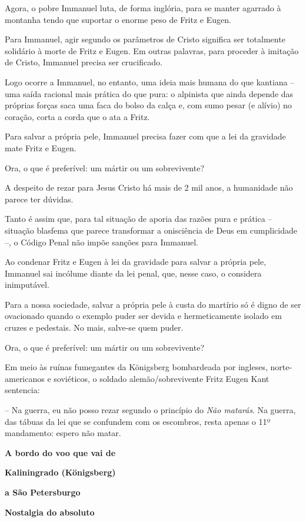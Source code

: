 Agora, o pobre Immanuel luta, de forma inglória, para se manter agarrado
à montanha tendo que suportar o enorme peso de Fritz e Eugen.

Para Immanuel, agir segundo os parâmetros de Cristo significa ser
totalmente solidário à morte de Fritz e Eugen. Em outras palavras, para
proceder à imitação de Cristo, Immanuel precisa ser crucificado.

Logo ocorre a Immanuel, no entanto, uma ideia mais humana do que
kantiana -- uma saída racional mais prática do que pura: o alpinista que
ainda depende das próprias forças saca uma faca do bolso da calça e, com
sumo pesar (e alívio) no coração, corta a corda que o ata a Fritz.

Para salvar a própria pele, Immanuel precisa fazer com que a lei da
gravidade mate Fritz e Eugen.

Ora, o que é preferível: um mártir ou um sobrevivente?

A despeito de rezar para Jesus Cristo há mais de 2 mil anos, a
humanidade não parece ter dúvidas.

Tanto é assim que, para tal situação de aporia das razões pura e prática
-- situação blasfema que parece transformar a onisciência de Deus em
cumplicidade --, o Código Penal não impõe sanções para Immanuel.

Ao condenar Fritz e Eugen à lei da gravidade para salvar a própria pele,
Immanuel sai incólume diante da lei penal, que, nesse caso, o considera
inimputável.

Para a nossa sociedade, salvar a própria pele à custa do martírio só é
digno de ser ovacionado quando o exemplo puder ser devida e
hermeticamente isolado em cruzes e pedestais. No mais, salve-se quem
puder.

Ora, o que é preferível: um mártir ou um sobrevivente?

Em meio às ruínas fumegantes da Königsberg bombardeada por ingleses,
norte-americanos e soviéticos, o soldado alemão/sobrevivente Fritz Eugen
Kant sentencia:

-- Na guerra, eu não posso rezar segundo o princípio do \emph{Não
matarás}. Na guerra, das tábuas da lei que se confundem com os
escombros, resta apenas o 11º mandamento: espero não matar.

\textbf{A bordo do voo que vai de }

\textbf{Kaliningrado (Königsberg) }

\textbf{a São Petersburgo}

\textbf{Nostalgia do absoluto}

